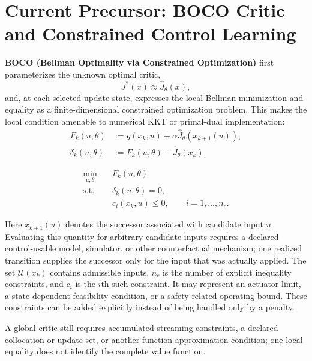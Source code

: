 \documentclass[a4paper]{article}
\begin{document}
\section{Current Precursor: BOCO Critic and Constrained Control Learning}

\textbf{BOCO (Bellman Optimality via Constrained Optimization)} first
parameterizes the unknown optimal critic,
\begin{equation}
  J^*(x)\approx\widehat J_\theta(x),
\end{equation}
and, at each selected update state, expresses the local Bellman minimization
and equality as a finite-dimensional constrained optimization problem. This
makes the local condition amenable to numerical KKT or primal-dual
implementation:
\begin{equation}
  \begin{aligned}
    F_k(u,\theta)
    &:=
    g(x_k,u)
    +
    \alpha\widehat J_\theta
    \!\left(x_{k+1}(u)\right),\\
    \delta_k(u,\theta)
    &:=
    F_k(u,\theta)
    -
    \widehat J_\theta(x_k).
  \end{aligned}
\end{equation}

\begin{equation}
  \begin{aligned}
    \min_{u,\theta}\quad
    &F_k(u,\theta)\\
    \mathrm{s.t.}\quad
    &\delta_k(u,\theta)=0,\\
    &c_i(x_k,u)\le 0,
    \qquad i=1,\ldots,n_c.
  \end{aligned}
\end{equation}

Here $x_{k+1}(u)$ denotes the successor associated with candidate input $u$.
Evaluating this quantity for arbitrary candidate inputs requires a declared
control-usable model, simulator, or other counterfactual mechanism; one
realized transition supplies the successor only for the input that was actually
applied. The set $\mathcal U(x_k)$ contains admissible inputs, $n_c$ is the
number of explicit inequality constraints, and $c_i$ is the $i$th such
constraint. It may represent an actuator limit, a state-dependent feasibility
condition, or a safety-related operating bound. These constraints can be added
explicitly instead of being handled only by a penalty.

A global critic still requires accumulated streaming constraints, a declared
collocation or update set, or another function-approximation condition; one
local equality does not identify the complete value function.
\end{document}
